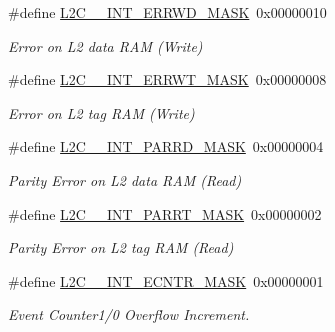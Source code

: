 \begin{DoxyCompactItemize}
\#define \mbox{\hyperlink{group__L2C-310__cache_ga2ad8ba7d482f3319c1cb8021612d88d4}{L2\+C\+\_\+\_\+\+I\+N\+T\+\_\+\+E\+R\+R\+W\+D\+\_\+\+M\+A\+SK}}~0x00000010
\begin{DoxyCompactList}\small\item\em Error on L2 data R\+AM (Write) \end{DoxyCompactList}\item 
\mbox{\label{group__L2C-310__cache_gad93769a401c906e3443ec9e642ac2739}} 
\#define \mbox{\hyperlink{group__L2C-310__cache_gad93769a401c906e3443ec9e642ac2739}{L2\+C\+\_\+\_\+\+I\+N\+T\+\_\+\+E\+R\+R\+W\+T\+\_\+\+M\+A\+SK}}~0x00000008
\begin{DoxyCompactList}\small\item\em Error on L2 tag R\+AM (Write) \end{DoxyCompactList}\item 
\mbox{\label{group__L2C-310__cache_ga97b2198e09919e5d7848829d7e81f8ca}} 
\#define \mbox{\hyperlink{group__L2C-310__cache_ga97b2198e09919e5d7848829d7e81f8ca}{L2\+C\+\_\+\_\+\+I\+N\+T\+\_\+\+P\+A\+R\+R\+D\+\_\+\+M\+A\+SK}}~0x00000004
\begin{DoxyCompactList}\small\item\em Parity Error on L2 data R\+AM (Read) \end{DoxyCompactList}\item 
\mbox{\label{group__L2C-310__cache_ga0c35d3e01ffbcc5cdcb5452f40d91bba}} 
\#define \mbox{\hyperlink{group__L2C-310__cache_ga0c35d3e01ffbcc5cdcb5452f40d91bba}{L2\+C\+\_\+\_\+\+I\+N\+T\+\_\+\+P\+A\+R\+R\+T\+\_\+\+M\+A\+SK}}~0x00000002
\begin{DoxyCompactList}\small\item\em Parity Error on L2 tag R\+AM (Read) \end{DoxyCompactList}\item 
\mbox{\label{group__L2C-310__cache_ga587ad034aa3d38107a48c091a724fec8}} 
\#define \mbox{\hyperlink{group__L2C-310__cache_ga587ad034aa3d38107a48c091a724fec8}{L2\+C\+\_\+\_\+\+I\+N\+T\+\_\+\+E\+C\+N\+T\+R\+\_\+\+M\+A\+SK}}~0x00000001
\begin{DoxyCompactList}\small\item\em Event Counter1/0 Overflow Increment. \end{DoxyCompactList}\end{DoxyCompactItemize}


